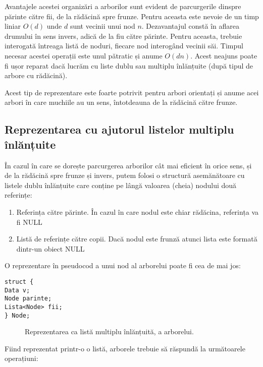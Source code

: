 Avantajele acestei organizări a arborilor sunt evident de parcurgerile dinspre părinte către fii, de la rădăcină spre frunze.
Pentru aceasta este nevoie de un timp liniar $O(d)$ unde $d$ sunt vecinii unui nod $n$.
Dezavantajul constă în aflarea drumului în sens invers, adică de la fiu către părinte. Pentru aceasta, trebuie interogată întreaga listă de noduri, fiecare nod interogând vecinii săi. Timpul necesar acestei operații este unul pătratic și anume $O(dn)$.
Acest neajuns poate fi ușor reparat dacă lucrăm cu liste dublu sau multiplu înlănțuite (după tipul de arbore cu rădăcină). 

Acest tip de reprezentare este foarte potrivit pentru arbori orientați și anume acei arbori în care muchiile au un sens, întotdeauna de la rădăcină către frunze.


\subsection{Reprezentarea cu ajutorul listelor multiplu înlănțuite}

În cazul în care se dorește parcurgerea arborilor cât mai eficient în orice sens, și de la rădăcină spre frunze și invers, putem folosi o structură asemănătoare cu listele dublu înlănțuite care conține pe lângă valoarea (cheia) nodului două referințe:

\begin{enumerate}
	\item {Referința către părinte. În cazul în care nodul este chiar rădăcina, referința va fi NULL}
	\item {Listă de referințe către copii. Dacă nodul este frunză atunci lista este formată dintr-un obiect NULL}
\end{enumerate}

O reprezentare în pseudocod a unui nod al arborelui poate fi cea de mai jos:

\begin{lstlisting}
struct {
Data v;
Node parinte;
Lista<Node> fii;
} Node;
\end{lstlisting}		

\begin{figure}[H] 
	\centering	
	{
	}
	\caption{Reprezentarea ca listă multiplu înlănțuită, a arborelui.} 
	\label{fig:reprezentaresirurilistemultiple}
\end{figure}

Fiind reprezentat printr-o o listă, arborele trebuie să răspundă la următoarele operațiuni:

